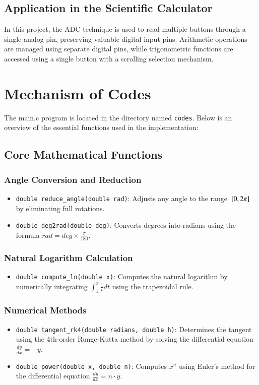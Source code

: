 \documentclass[a4paper,12pt]{article}
\theoremstyle{remark}
\begin{document}
\subsection{Application in the Scientific Calculator}
In this project, the ADC technique is used to read multiple buttons through a single analog pin, preserving valuable digital input pins. Arithmetic operations are managed using separate digital pins, while trigonometric functions are accessed using a single button with a scrolling selection mechanism.


\section{Mechanism of Codes}

The main.c program is located in the directory named \texttt{codes}.  
Below is an overview of the essential functions used in the implementation:

\subsection{Core Mathematical Functions}
\subsubsection{Angle Conversion and Reduction}
\begin{itemize}
    \item \texttt{double reduce\_angle(double rad)}: Adjusts any angle to the range ${}\left[0, 2\pi\right]$ by eliminating full rotations.  
    \item \texttt{double deg2rad(double deg)}: Converts degrees into radians using the formula $rad = deg \times \frac{\pi}{180}$.  
\end{itemize}

\subsubsection{Natural Logarithm Calculation}
\begin{itemize}
    \item \texttt{double compute\_ln(double x)}: Computes the natural logarithm by numerically integrating $\int_1^x \frac{1}{t} dt$ using the trapezoidal rule.  
\end{itemize}

\subsubsection{Numerical Methods}
\begin{itemize}
    \item \texttt{double tangent\_rk4(double radians, double h)}: Determines the tangent using the 4th-order Runge-Kutta method by solving the differential equation $\frac{dy}{dx} = -y$.
    \item \texttt{double power(double x, double n)}: Computes $x^n$ using Euler's method for the differential equation $\frac{dy}{dx} = n \cdot y$.  
\end{itemize}
\end{document}

